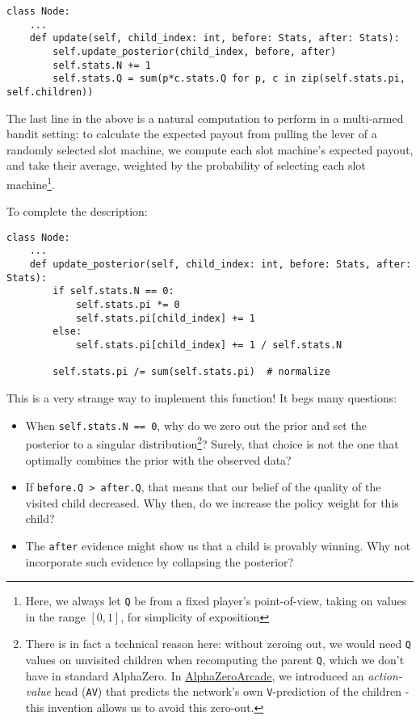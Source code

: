 \documentclass[tikz]{article}
\begin{document}
\begin{tcolorbox}
\begin{verbatim}
class Node:
    ...
    def update(self, child_index: int, before: Stats, after: Stats):
        self.update_posterior(child_index, before, after)
        self.stats.N += 1
        self.stats.Q = sum(p*c.stats.Q for p, c in zip(self.stats.pi, self.children))
\end{verbatim}
\end{tcolorbox}

The last line in the above is a natural computation to perform in a multi-armed bandit setting: 
to calculate the expected payout from pulling the lever of a randomly selected slot machine, 
we compute each slot machine's expected payout, and take their average, weighted by the probability of
selecting each slot machine\footnote{Here, we always let \texttt{Q} be from a fixed player's point-of-view, taking on values in the range $[0, 1]$, for simplicity of exposition}. \newline

To complete the description:

\begin{tcolorbox}
\begin{verbatim}
class Node:
    ...
    def update_posterior(self, child_index: int, before: Stats, after: Stats):
        if self.stats.N == 0:
            self.stats.pi *= 0
            self.stats.pi[child_index] += 1
        else:
            self.stats.pi[child_index] += 1 / self.stats.N

        self.stats.pi /= sum(self.stats.pi)  # normalize
\end{verbatim}
\end{tcolorbox}

This is a very strange way to implement this function! It begs many questions:

\begin{itemize}
    \item When \texttt{self.stats.N == 0}, why do we zero out the prior and set the posterior to a singular distribution\footnote{
    There is in fact a technical reason here: without zeroing out, we would need \texttt{Q} values on unvisited children when recomputing
    the parent \texttt{Q}, which we don't have in standard AlphaZero. In \href{https://github.com/shindavid/AlphaZeroArcade}{AlphaZeroArcade},
    we introduced an \emph{action-value} head (\texttt{AV}) that predicts the network's own \texttt{V}-prediction of the children - this invention
    allows us to avoid this zero-out.}?
    Surely, that choice is not the one that optimally combines the prior with the observed data?
    \item If \texttt{before.Q > after.Q}, that means that our belief of the quality of the visited child decreased. Why then, do we increase the policy weight for this child?
    \item The \texttt{after} evidence might show us that a child is provably winning. Why not incorporate such evidence by collapsing the posterior?
\end{itemize}
\end{document}
